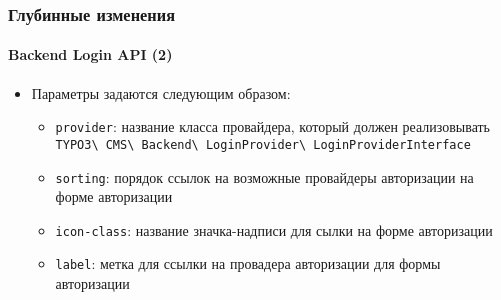 \begin{frame}[fragile]
	\frametitle{Глубинные изменения}
	\framesubtitle{Backend Login API (2)}

	\begin{itemize}

		\item Параметры задаются следующим образом:

			\begin{itemize}

				\item \texttt{provider}:\newline
					название класса провайдера, который должен реализовывать
						\texttt{TYPO3\textbackslash
							CMS\textbackslash
							Backend\textbackslash
							LoginProvider\textbackslash
							LoginProviderInterface}

				\item \texttt{sorting}:\newline
					порядок ссылок на возможные провайдеры авторизации на форме авторизации

				\item \texttt{icon-class}:\newline
					название значка-надписи для сылки на форме авторизации

				\item \texttt{label}:\newline
					метка для ссылки на провадера авторизации для формы авторизации
			\end{itemize}

	\end{itemize}

\end{frame}


